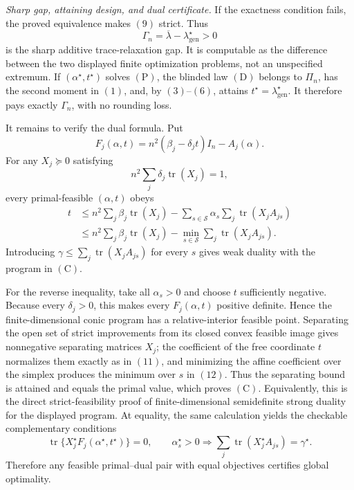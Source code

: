 \textit{Sharp gap, attaining design, and dual certificate.}
If the exactness condition fails, the proved equivalence makes \((9)\) strict.  Thus
\[
\Gamma_n=\overline\lambda-\lambda_{\mathrm{gen}}^\star>0
\]
is the sharp additive trace-relaxation gap.  It is computable as the difference between the two displayed finite optimization problems, not an unspecified extremum.  If \((\alpha^\star,t^\star)\) solves \((\mathrm P)\), the blinded law \((\mathrm D)\) belongs to \(\Pi_n\), has the second moment in \((1)\), and, by \((3)\)--\((6)\), attains \(t^\star=\lambda_{\mathrm{gen}}^\star\).  It therefore pays exactly \(\Gamma_n\), with no rounding loss.

It remains to verify the dual formula.  Put
\[
F_j(\alpha,t)=n^2(\beta_j-\delta_jt)I_n-A_j(\alpha).
\]
For any \(X_j\succeq0\) satisfying
\[
n^2\sum_j\delta_j\operatorname{tr}(X_j)=1,
\tag{11}
\]
every primal-feasible \((\alpha,t)\) obeys
\[
\begin{aligned}
t
&\le n^2\sum_j\beta_j\operatorname{tr}(X_j)
-\sum_{s\in\mathscr S}\alpha_s
  \sum_j\operatorname{tr}(X_jA_{js})\\
&\le n^2\sum_j\beta_j\operatorname{tr}(X_j)
-\min_{s\in\mathscr S}\sum_j\operatorname{tr}(X_jA_{js}).
\end{aligned}
\tag{12}
\]
Introducing \(\gamma\le\sum_j\operatorname{tr}(X_jA_{js})\) for every \(s\) gives weak duality with the program in \((\mathrm C)\).

For the reverse inequality, take all \(\alpha_s>0\) and choose \(t\) sufficiently negative.  Because every \(\delta_j>0\), this makes every \(F_j(\alpha,t)\) positive definite.  Hence the finite-dimensional conic program has a relative-interior feasible point.  Separating the open set of strict improvements from its closed convex feasible image gives nonnegative separating matrices \(X_j\); the coefficient of the free coordinate \(t\) normalizes them exactly as in \((11)\), and minimizing the affine coefficient over the simplex produces the minimum over \(s\) in \((12)\).  Thus the separating bound is attained and equals the primal value, which proves \((\mathrm C)\).  Equivalently, this is the direct strict-feasibility proof of finite-dimensional semidefinite strong duality for the displayed program.  At equality, the same calculation yields the checkable complementary conditions
\[
\operatorname{tr}\{X_j^\star F_j(\alpha^\star,t^\star)\}=0,
\qquad
\alpha_s^\star>0
\Longrightarrow
\sum_j\operatorname{tr}(X_j^\star A_{js})=\gamma^\star.
\tag{13}
\]
Therefore any feasible primal--dual pair with equal objectives certifies global optimality.

